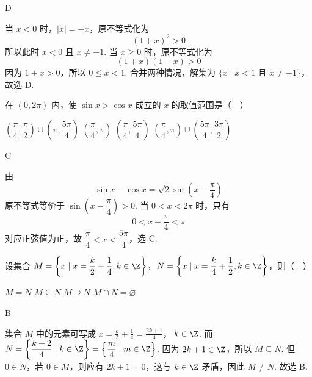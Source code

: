 \begin{answer}
D
\end{answer}

\begin{solution}
当 \(x<0\) 时，\(|x|=-x\)，原不等式化为
\[
(1+x)^2>0
\]
所以此时 \(x<0\) 且 \(x\ne-1\). 当 \(x\geqslant0\) 时，原不等式化为
\[
(1+x)(1-x)>0
\]
因为 \(1+x>0\)，所以 \(0\leqslant x<1\). 合并两种情况，解集为 \(\{x\mid x<1\text{ 且 }x\ne-1\}\)，故选 D.
\end{solution}

\begin{problem}
在 \((0,2\pi)\) 内，使 \(\sin x > \cos x\) 成立的 \(x\) 的取值范围是（\(\quad\)）

\choices
    {\(\left(\dfrac{\pi}{4},\dfrac{\pi}{2}\right)\cup \left(\pi,\dfrac{5\pi}{4}\right)\)}
    {\(\left(\dfrac{\pi}{4},\pi\right)\)}
    {\(\left(\dfrac{\pi}{4},\dfrac{5\pi}{4}\right)\)}
    {\(\left(\dfrac{\pi}{4},\pi\right) \cup \left(\dfrac{5\pi}{4}, \dfrac{3\pi}{2}\right)\)}
\end{problem}

\begin{answer}
C
\end{answer}

\begin{solution}
由
\[
\sin x-\cos x=\sqrt{2}\sin\left(x-\frac{\pi}{4}\right)
\]
原不等式等价于 \(\sin\left(x-\dfrac{\pi}{4}\right)>0\). 当 \(0<x<2\pi\) 时，只有
\[
0<x-\frac{\pi}{4}<\pi
\]
对应正弦值为正，故 \(\dfrac{\pi}{4}<x<\dfrac{5\pi}{4}\)，选 C.
\end{solution}

\begin{problem}
设集合 \(M = \left\{x \mid x = \dfrac{k}{2} + \dfrac{1}{4}, k \in \Z\right\}\)，\(N = \left\{x \mid x = \dfrac{k}{4} + \dfrac{1}{2}, k \in \Z\right\}\)，则（\(\quad\)）

\choices
    {\(M = N\)}
    {\(M \subseteq N\)}
    {\(M \supseteq N\)}
    {\(M \cap N = \varnothing\)}
\end{problem}

\begin{answer}
B
\end{answer}

\begin{solution}
集合 \(M\) 中的元素可写成
\(x=\frac{k}{2}+\frac14=\frac{2k+1}{4}\)，\(\; k\in\Z\).
而 \(N=\left\{\dfrac{k+2}{4}\mid k\in\Z\right\}=\left\{\dfrac{m}{4}\mid m\in\Z\right\}\). 因为 \(2k+1\in\Z\)，所以 \(M\subseteq N\). 但 \(0\in N\)，若 \(0\in M\)，则应有 \(2k+1=0\)，这与 \(k\in\Z\) 矛盾，因此 \(M\ne N\). 故选 B.
\end{solution}

